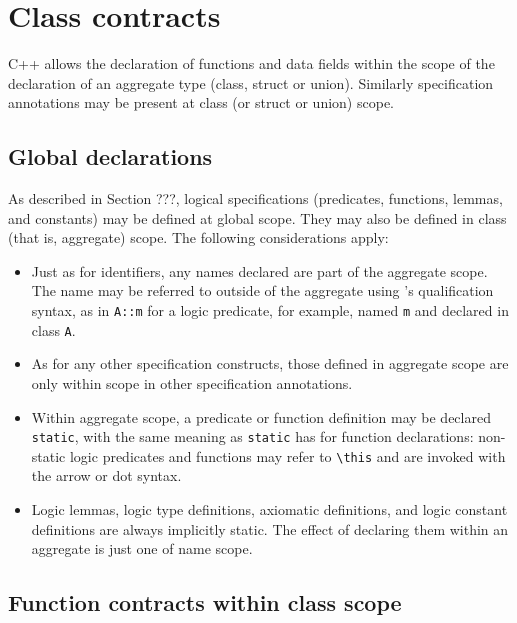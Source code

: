 \section{Class contracts}
\label{sec:class-contracts}

C++ allows the declaration of functions and data fields within
the scope of the declaration of an aggregate type (class, struct or union). Similarly \NAME{} specification annotations
may be present at class (or struct or union) scope.

\subsection{Global declarations}

As described in Section ???, logical specifications (predicates, functions, lemmas, and constants) may be defined at global scope. They may also be defined in class (that is, aggregate) scope. The following considerations apply:
\begin{itemize}
	\item Just as for \lang{} identifiers, any names 
	declared are part of the aggregate scope. The name may
	be referred to outside of the aggregate using \lang's 
	qualification syntax, as in \lstinline|A::m| for a 
	logic predicate, for example, named \lstinline|m| and
	declared in class \lstinline|A|.
	\item As for any other specification constructs, those defined in aggregate scope are only within scope in other specification annotations.
	\item Within aggregate scope, a predicate or function definition may be
	declared \lstinline|static|, with the same meaning as 
	\lstinline|static| has for \lang{} function 
	declarations: non-static logic predicates and functions
	may refer to \lstinline|\this| and are invoked with the
	\lang{} arrow or dot syntax.
	\item Logic lemmas, logic type definitions, axiomatic definitions, and logic constant definitions are always implicitly static. The effect of declaring them within an aggregate is just one of name scope.
\end{itemize}



\subsection{Function contracts within class scope}

